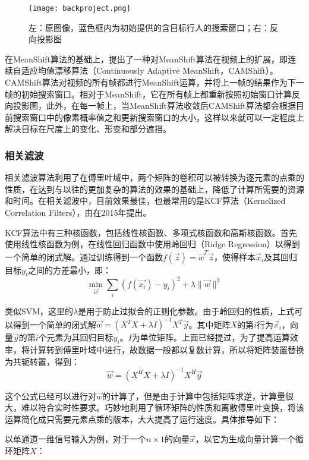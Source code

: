\begin{figure}[htb]
  \centering
  \texttt{[image: backproject.png]}
  \caption{左：原图像，蓝色框内为初始提供的含目标行人的搜索窗口；右：反向投影图}
  \label{fig:backproject}
\end{figure}

  在MeanShift算法的基础上，\citet{bradski1998computer}提出了一种对MeanShift算法在视频上的扩展，即连续自适应均值漂移算法（Continuously Adaptive MeanShift，CAMShift）。CAMShift算法对视频的所有帧都进行MeanShift运算，并将上一帧的结果作为下一帧的初始搜索窗口。相对于MeanShift，它在所有帧上都重新按照初始窗口计算反向投影图，此外，在每一帧上，当MeanShift算法收敛后CAMShift算法都会根据目前搜索窗口中的像素概率值之和更新搜索窗口的大小，这样以来就可以一定程度上解决目标在尺度上的变化、形变和部分遮挡。

\subsubsection{相关滤波}

  相关滤波算法利用了在傅里叶域中，两个矩阵的卷积可以被转换为逐元素的点乘的性质，在达到与以往的更加复杂的算法的效果的基础上，降低了计算所需要的资源和时间。在相关滤波中，目前效果最佳，也最常用的是KCF算法（Kernelized Correlation Filters），由\citet{henriques2015high}在2015年提出。

  KCF算法中有三种核函数，包括线性核函数、多项式核函数和高斯核函数。首先使用线性核函数为例，在线性回归函数中使用岭回归（Ridge Regression）以得到一个简单的闭式解。通过训练得到一个函数$f(\vec{z})=\vec{w}^T\vec{z}$，使得样本$\vec{x}_i$及其回归目标$y_i$之间的方差最小，即：
$$\min_{\vec{w}}\sum_i (f(\vec{x_i})-y_i)^2+\lambda \lVert\vec{w}\rVert^2$$

  类似SVM，这里的$\lambda$是用于防止过拟合的正则化参数。由于岭回归的性质，上式可以得到一个简单的闭式解$\vec{w}=(X^TX+\lambda I)^{-1}X^T\vec{y}$。其中矩阵$X$的第$i$行为$\vec{x}_i$，向量$\vec{y}$的第$i$个元素为其回归目标$y_i$。$I$为单位矩阵。上面已经提过，为了提高运算效率，将计算转到傅里叶域中进行，故数据一般都以复数计算，所以将矩阵装置替换为共轭转置，得到：
$$\vec{w}=(X^HX+\lambda I)^{-1}X^H\vec{y}$$

  这个公式已经可以进行对$\vec{w}$的计算了，但是由于计算中包括矩阵求逆，计算量很大，难以符合实时性要求。\citet{henriques2015high}巧妙地利用了循环矩阵的性质和离散傅里叶变换，将该运算简化成只需要元素点乘的版本，大大提高了运行速度。具体推导如下：

  以单通道一维信号输入为例，对于一个$n\times1$的向量$\vec{x}$，以它为生成向量计算一个循环矩阵$X$：

